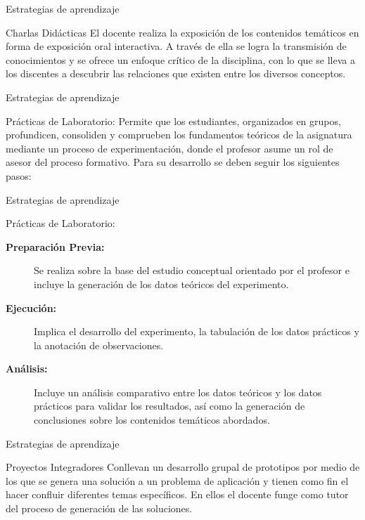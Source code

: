 \documentclass[handout,xcolor=dvipsnames]{beamer}
\newcommand{\pageframe}[1]{\frame{\begin{center}{ \Huge #1 }\end{center}}}
\begin{document}
\pageframe{Estrategias de aprendizaje}

\begin{frame}{Estrategias de aprendizaje}
  \begin{block}{Charlas Didácticas}
    El docente realiza la exposición de los contenidos temáticos en forma de exposición oral interactiva. A través de ella se logra la transmisión de conocimientos y se ofrece un enfoque crítico de la disciplina, con lo que se lleva a los discentes a descubrir las relaciones que existen entre los diversos conceptos.
  \end{block}
\end{frame}

\begin{frame}{Estrategias de aprendizaje}
  \begin{block}{Prácticas de Laboratorio:}
    Permite que los estudiantes, organizados en grupos, profundicen, consoliden y comprueben los fundamentos teóricos de la asignatura mediante un proceso de experimentación, donde el profesor asume un rol de asesor del proceso formativo. Para su desarrollo se deben seguir los siguientes pasos:
  \end{block}
\end{frame}

\begin{frame}{Estrategias de aprendizaje}
  \begin{block}{Prácticas de Laboratorio:}
    \begin{description}
      \item[\textbf{Preparación Previa:}] Se realiza sobre la base del estudio conceptual orientado por el profesor e incluye la generación de los datos teóricos del experimento.
      \item[\textbf{Ejecución:}] Implica el desarrollo del experimento, la tabulación de los datos prácticos y la anotación de observaciones.
      \item[\textbf{Análisis:}] Incluye un análisis comparativo entre los datos teóricos y los datos prácticos para validar los resultados, así como la generación de conclusiones sobre los contenidos temáticos abordados.
    \end{description}
  \end{block}
\end{frame}


\begin{frame}{Estrategias de aprendizaje}
  \begin{block}{Proyectos Integradores}
    Conllevan un desarrollo grupal de prototipos por medio de los que se genera una solución a un problema de aplicación y tienen como fin el hacer confluir diferentes temas específicos. En ellos el docente funge como tutor del proceso de generación de las soluciones.
  \end{block}
\end{frame}
\end{document}
